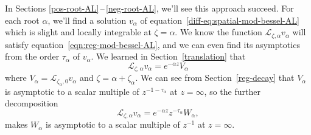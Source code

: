 \documentclass{article}
\newcommand{\fracderiv}[3]{\partial^{#1}_{#2, #3}}
\newcommand{\laplace}{\mathcal{L}}
\begin{document}
In Sections \ref{pos-root-AL}\,--\,\ref{neg-root-AL}, we'll see this approach succeed. For each root $\alpha$, we'll find a solution $v_\alpha$ of equation~\eqref{diff-eq:spatial-mod-bessel-AL} which is slight and locally integrable at $\zeta = \alpha$. We know the function $\laplace_{\zeta, \alpha} v_\alpha$ will satisfy equation~\eqref{eqn:reg-mod-bessel-AL}, and we can even find its asymptotics from the order $\tau_\alpha$ of $v_\alpha$. We learned in Section~\ref{translation} that
\[ \laplace_{\zeta, \alpha} v_\alpha = e^{-\alpha z} V_\alpha \]
where $V_\alpha = \laplace_{\zeta_\alpha, 0} v_\alpha$ and $\zeta = \alpha + \zeta_\alpha$. We can see from Section~\ref{reg-decay} that $V_\alpha$ is asymptotic to a scalar multiple of $z^{-1 - \tau_\alpha}$ at $z = \infty$, so the further decomposition
\[ \laplace_{\zeta, \alpha} v_\alpha = e^{-\alpha z} z^{-\tau_\alpha} W_\alpha, \]
makes $W_\alpha$ is asymptotic to a scalar multiple of $z^{-1}$ at $z = \infty$.
\end{document}
